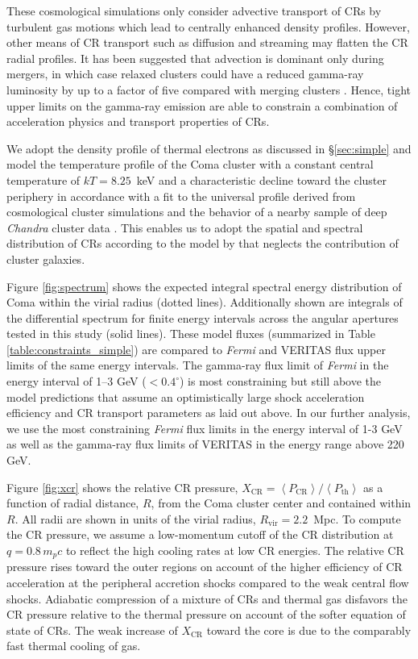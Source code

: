 \documentclass[12pt,manuscript]{aastex}
\def\Fermi{{\em Fermi}\xspace}
\newcommand{\expval}[1]{\left\langle #1 \right\rangle}
\newcommand{\rmn}{\mathrm}
\newcommand{\CR}{\mathrm{CR}}
\begin{document}
These cosmological simulations only consider advective transport of CRs by turbulent gas motions
which lead to centrally enhanced density profiles.  However, other means of CR transport such as
diffusion and streaming may flatten the CR radial profiles. It has been suggested that advection is
dominant only during mergers, in which case relaxed clusters could have a reduced gamma-ray
luminosity by up to a factor of five compared with merging clusters
\citep{article:EnsslinPfrommerMiniatiSubramanian:2011}. Hence, tight upper limits on the gamma-ray
emission are able to constrain a combination of acceleration physics and transport properties of
CRs.

We adopt the density profile of thermal electrons as discussed in \S \ref{sec:simple} and model the
temperature profile
of the Coma cluster with a constant central temperature of $kT= 8.25$~keV and a characteristic
decline toward the cluster periphery in accordance with a fit to the universal profile derived from
cosmological cluster simulations \citep{article:PinzkePfrommer:2010, article:Pfrommer_etal:2007}
and the behavior of a nearby sample of deep {\em Chandra} cluster data
\citep{article:Vikhlinin_etal:2005}. This enables us to adopt the spatial and spectral distribution
of CRs according to the model by \citet{article:PinzkePfrommer:2010} that neglects the contribution
of cluster galaxies.

Figure \ref{fig:spectrum} shows the expected integral spectral energy distribution of Coma within
the virial radius (dotted lines). Additionally shown are integrals of the differential spectrum for
finite energy intervals across the angular apertures tested in this study (solid lines). These model
fluxes (summarized in Table \ref{table:constraints_simple}) are compared to \Fermi and VERITAS
flux upper limits of the same energy intervals.  The gamma-ray flux limit of \Fermi in the
energy interval of 1--3 GeV ($<0.4^\circ$) is most constraining but still above the model
predictions that assume an optimistically large shock acceleration efficiency and CR transport
parameters as laid out above.  In our further analysis, we use the most constraining \Fermi
flux limits in the energy interval of 1-3 GeV as well as the gamma-ray flux limits of VERITAS in the
energy range above 220 GeV.

Figure \ref{fig:xcr} shows the relative CR pressure, $X_{\CR} =
\expval{P_{\CR}}/\expval{P_\rmn{th}}$ as a function of radial distance, $R$, from the Coma cluster
center and contained within $R$. All radii are shown in units of the virial radius,
$R_\rmn{vir}=2.2$~Mpc. To compute the CR pressure, we assume a low-momentum cutoff of the CR
distribution at $q = 0.8\,m_p c$ to reflect the high cooling rates at low CR energies. The relative
CR pressure rises toward the outer regions on account of the higher efficiency of CR acceleration at
the peripheral accretion shocks compared to the weak central flow shocks. Adiabatic compression of a
mixture of CRs and thermal gas disfavors the CR pressure relative to the thermal pressure on
account of the softer equation of state of CRs. The weak increase of $X_{\CR}$ toward the core is
due to the comparably fast thermal cooling of gas.
\end{document}
